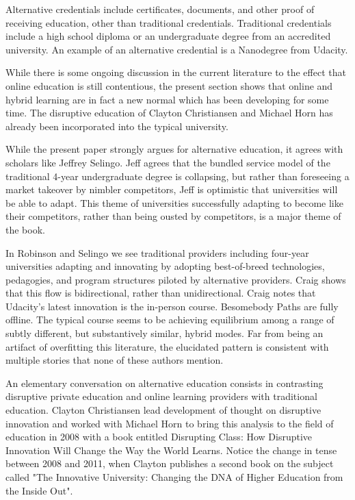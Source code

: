 \documentclass[AER]{/Users/zyl357/Documents/GitHub/research-dissertation-case-for-alt-ed/papers/alt-ed-survey/aea-latex-templates/AEA}
\begin{document}
Alternative credentials include certificates, documents, and other proof
of receiving education, other than traditional credentials. Traditional
credentials include a high school diploma or an undergraduate degree from
an accredited university. An example of an alternative credential is a
Nanodegree from Udacity.

While there is some ongoing discussion in the current literature to the
effect that online education is still contentious, the present section
shows that online and hybrid learning are in fact a new normal which has
been developing for some time. The disruptive education of Clayton
Christiansen and Michael Horn has already been incorporated into the
typical university\cite{horn2008disrupting}.

While the present paper strongly argues for alternative education, it
agrees with scholars like Jeffrey Selingo. Jeff agrees that the bundled
service model of the traditional 4-year undergraduate degree is
collapsing, but rather than foreseeing a market takeover by nimbler
competitors, Jeff is optimistic that universities will be able to adapt.
This theme of universities successfully adapting to become like their
competitors, rather than being ousted by competitors, is a major theme of
the book.

In Robinson\cite{robinson2016creative} and Selingo\cite{selingo2013college} we see traditional providers including four-year
universities adapting and innovating by adopting best-of-breed
technologies, pedagogies, and program structures piloted by alternative
providers. Craig shows that this flow is bidirectional, rather than
unidirectional. Craig notes that Udacity's latest innovation is the
in-person course\cite{craig_2018}. Besomebody Paths are fully offline. The typical course
seems to be achieving equilibrium among a range of subtly different, but
substantively similar, hybrid modes. Far from being an artifact of
overfitting this literature, the elucidated pattern is consistent with
multiple stories that none of these authors mention.

An elementary conversation on alternative education consists in
contrasting disruptive private education and online learning providers
with traditional education. Clayton Christiansen lead development of
thought on disruptive innovation\cite{bower1995disruptive} and worked with Michael Horn to bring
this analysis to the field of education in 2008 with a book entitled
Disrupting Class: How Disruptive Innovation Will Change the Way the World
Learns. Notice the change in tense between 2008 and 2011, when Clayton
publishes a second book on the subject called "The Innovative University:
Changing the DNA of Higher Education from the Inside Out\cite{christensen2011innovative}".
\end{document}
